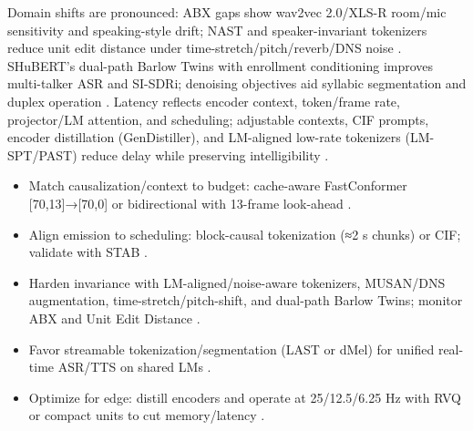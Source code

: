 Domain shifts are pronounced: ABX gaps show wav2vec 2.0/XLS-R room/mic sensitivity and speaking-style drift; NAST and speaker-invariant tokenizers reduce unit edit distance under time-stretch/pitch/reverb/DNS noise \cite{fily2024establishingdegreesclosenessbetweenaudio,messica2024nastnoiseawarespeechtokenizationlanguage,chang2024dcspinspeakerinvariantspeechtokenizerspo}. SHuBERT’s dual-path Barlow Twins with enrollment conditioning improves multi-talker ASR and SI-SDRi; denoising objectives aid syllabic segmentation and duplex operation \cite{entry2025selectivehubertselfsupervisedpretraining,cho2025sylbersyllabicembeddingrepresentationspe,ma2024languagemodelcanlistenwhilespeaking}. Latency reflects encoder context, token/frame rate, projector/LM attention, and scheduling; adjustable contexts, CIF prompts, encoder distillation (GenDistiller), and LM-aligned low-rate tokenizers (LM-SPT/PAST) reduce delay while preserving intelligibility \cite{chen2024bestowefficientstreamablespeechlanguagem,deng2025simuls2sllmunlockingsimultaneousinferenc,gao2024gendistillerdistillingpretrainedlanguage,jo2025lmsptalignedsemanticdistillationspeechto,har-tuv2025pastphoneticacousticspeechtokenizer}.

\begin{itemize}
  \item Match causalization/context to budget: cache-aware FastConformer [70,13]→[70,0] or bidirectional with 13-frame look-ahead \cite{chen2024bestowefficientstreamablespeechlanguagem}.
  \item Align emission to scheduling: block-causal tokenization (≈2 s chunks) or CIF; validate with STAB \cite{vashishth2024stabspeechtokenizerassessmentbenchmark,deng2025simuls2sllmunlockingsimultaneousinferenc}.
  \item Harden invariance with LM-aligned/noise-aware tokenizers, MUSAN/DNS augmentation, time-stretch/pitch-shift, and dual-path Barlow Twins; monitor ABX and Unit Edit Distance \cite{turetzky2024lastlanguagemodelawarespeechtokenization,messica2024nastnoiseawarespeechtokenizationlanguage,poli2025fastabxlibraryefficientcomputationabxdis}.
  \item Favor streamable tokenization/segmentation (LAST or dMel) for unified real-time ASR/TTS on shared LMs \cite{turetzky2024lastlanguagemodelawarespeechtokenization,bai2025dmelspeechtokenizationmadesimple}.
  \item Optimize for edge: distill encoders and operate at 25/12.5/6.25 Hz with RVQ or compact units to cut memory/latency \cite{ahasan2025dmcodecdistillingmultimodalrepresentatio,jo2025lmsptalignedsemanticdistillationspeechto}.
\end{itemize}


